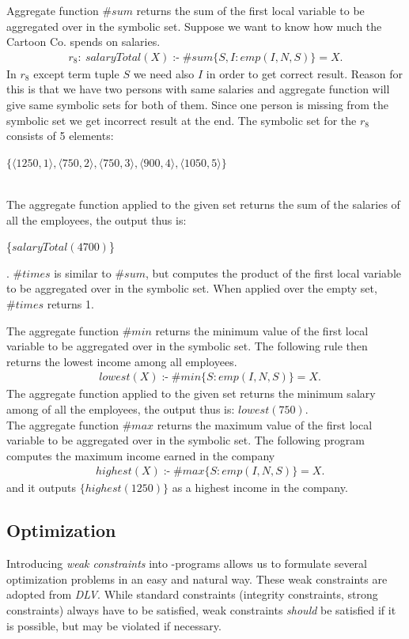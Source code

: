 \documentclass[a4paper, titlepage]{article}
\DeclareMathOperator{\leftimpl}{:-}
\begin{document}
Aggregate function $\mathit{\#sum}$ returns the 
sum of the first local variable to be aggregated over in 
the symbolic set. Suppose we want to know how much the 
Cartoon Co. spends on salaries.
\begin{align*}
\mathit{r_8 \colon \ salaryTotal(X)} \leftimpl \mathit{\#sum}\{S,I : 
\mathit{emp(I,N,S)}\} = X.
\end{align*}
In $r_8$ except term tuple $S$ we need also $I$ in order to get correct result. Reason for this is that we have two persons with same salaries and aggregate function will give same symbolic sets for both of them. Since one person is missing from the symbolic set we get incorrect result at the end.  
The symbolic set for the $r_8$ consists of 5 elements:\\ 
\centerline{$\{ \langle 1250,1 \rangle, \langle 750,2 \rangle, \langle 750,3 \rangle, \langle 900,4 \rangle, \langle 1050,5 \rangle\}$} 
\\The 
aggregate function applied to the given set returns the sum 
of the salaries of all the employees, the output thus is: 
\\ \centerline{
\{$\mathit{salaryTotal(4700)}$\}}. $\mathit{\#times}$ is 
similar to $\mathit{\#sum}$, but computes the product of 
the first local variable to be aggregated over in the 
symbolic set. When applied over the empty set, 
$\mathit{\#times}$ returns 1.

The aggregate function $\mathit{\#min}$ returns 
the minimum value of the first local variable to be 
aggregated over in the symbolic set. The following rule then returns the lowest income among all employees.
\begin{align*}
& lowest(X) \leftimpl \#min\{S : emp(I,N,S)\} = X.
\end{align*}
The aggregate function applied to the given set returns the 
minimum salary among of all the employees, the output thus 
is:
{$\mathit{lowest(750)}$}.
\bigskip \\The aggregate function $\mathit{\#max}$ returns 
the maximum value of the first local variable to be 
aggregated over in the symbolic set. The following program 
computes the maximum income earned in the company
\begin{align*}
& \mathit{highest}(X) \leftimpl \mathit{\#max}\{S : 
\mathit{emp}(I,N,S)\} = X.
\end{align*}
and it outputs $\{highest(1250)\}$ as a highest income in 
the company.

\subsection{Optimization}
\label{optimize}
Introducing \emph{weak constraints} into \hex-programs 
allows us to formulate several optimization problems in an 
easy and natural way. These weak constraints are adopted 
from \emph{DLV}. While standard constraints (integrity 
constraints, strong constraints) always have to be 
satisfied, weak constraints \emph{should} be satisfied if it is 
possible, but may be violated if necessary.
\end{document}
